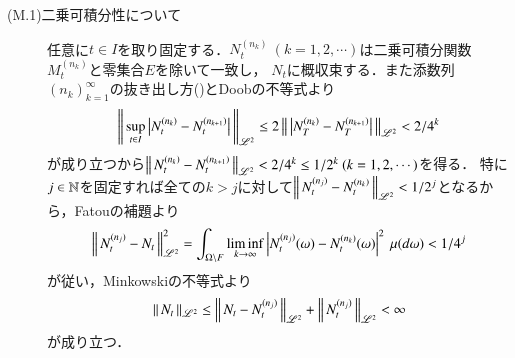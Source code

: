 \begin{prf}
\begin{description}
			\item[(M.1)二乗可積分性について]
				任意に$t \in I$を取り固定する．$N^{(n_k)}_t\ (k=1,2,\cdots)$は二乗可積分関数$M^{(n_k)}_t$と零集合$E$を除いて一致し，
				$N_t$に概収束する．また添数列$(n_k)_{k=1}^{\infty}$の抜き出し方()とDoobの不等式より
				\begin{align}
					\left\|\, \operatorname*{sup}_{t \in I} \left|N^{(n_k)}_t - N^{(n_{k+1})}_t\right|\, \right\|_{\mathscr{L}^2} \leq 2 \left\|\, \left|N^{(n_k)}_T - N^{(n_{k+1})}_T\right|\, \right\|_{\mathscr{L}^2} < 2/4^k
				\end{align}
				が成り立つから$\left\|\, N^{(n_k)}_t - N^{(n_{k+1})}_t\, \right\|_{\mathscr{L}^2} < 2/4^k \leq 1/2^k \ (k=1,2,\cdots)$を得る．
				特に$j \in \mathbb{N}$を固定すれば全ての$k > j$に対して$\left\|\, N^{(n_j)}_t - N^{(n_k)}_t\, \right\|_{\mathscr{L}^2} < 1/2^j$となるから，Fatouの補題より
				\begin{align}
					\left\|\, N^{(n_j)}_t - N_t\, \right\|_{\mathscr{L}^2}^2 = \int_{\Omega \backslash F} \liminf_{k \to \infty} \left| N^{(n_j)}_t(\omega) - N^{(n_k)}_t(\omega) \right|^2\ \mu(d\omega)
					< 1/4^j
					\label{eq:M_c2_hilbert_2}
				\end{align}
				が従い，Minkowskiの不等式より
				\begin{align}
					\left\|\, N_t\, \right\|_{\mathscr{L}^2} \leq \left\|\, N_t - N^{(n_j)}_t\, \right\|_{\mathscr{L}^2} + \left\|\, N^{(n_j)}_t\, \right\|_{\mathscr{L}^2} < \infty
				\end{align}
				が成り立つ．
			

\end{description}
\end{prf}
